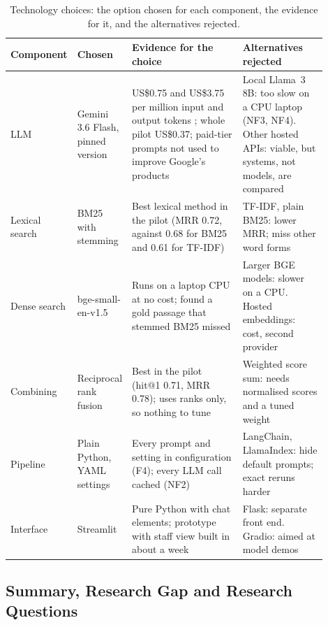 \documentclass[12pt,nonacm,acmlarge,titlepage,screen]{acmart}
\begin{document}
\begin{table}[H]
\caption{Technology choices: the option chosen for each component, the evidence for it, and the alternatives rejected.}
\label{tab:tech}
\footnotesize
\begin{tabular}{L{0.11\linewidth}L{0.16\linewidth}L{0.36\linewidth}L{0.27\linewidth}}
\toprule
Component & Chosen & Evidence for the choice & Alternatives rejected \\
\midrule
LLM & Gemini 3.6 Flash, pinned version & US\$0.75 and US\$3.75 per million input and output tokens \cite{google2026pricing}; whole pilot US\$0.37; paid-tier prompts not used to improve Google's products \cite{google2026terms} & Local Llama~3 8B: too slow on a CPU laptop (NF3, NF4). Other hosted APIs: viable, but systems, not models, are compared \\
Lexical search & BM25 with stemming \cite{robertson2009bm25} & Best lexical method in the pilot (MRR 0.72, against 0.68 for BM25 and 0.61 for TF-IDF) & TF-IDF, plain BM25: lower MRR; miss other word forms \\
Dense search & bge-small-en-v1.5 \cite{xiao2024cpack} & Runs on a laptop CPU at no cost; found a gold passage that stemmed BM25 missed & Larger BGE models: slower on a CPU. Hosted embeddings: cost, second provider \\
Combining & Reciprocal rank fusion \cite{cormack2009reciprocal} & Best in the pilot (hit@1 0.71, MRR 0.78); uses ranks only, so nothing to tune & Weighted score sum: needs normalised scores and a tuned weight \\
Pipeline & Plain Python, YAML settings & Every prompt and setting in configuration (F4); every LLM call cached (NF2) & LangChain, LlamaIndex: hide default prompts; exact reruns harder \\
Interface & Streamlit \cite{streamlit2026chat} & Pure Python with chat elements; prototype with staff view built in about a week & Flask: separate front end. Gradio: aimed at model demos \\
\bottomrule
\end{tabular}
\end{table}

\subsection{Summary, Research Gap and Research Questions} \label{sec:back_gap}
\end{document}
